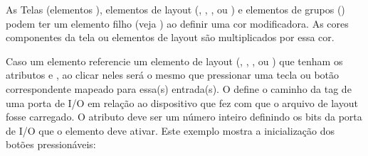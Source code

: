 \documentclass[letterpaper,10pt,brazil]{sphinxmanual}
\begin{document}
As Telas (elementos ), elementos de layout
(, , ,  ou ) e
elementos de grupos () podem ter um elemento filho 
(veja {\hyperref[techspecs/layout_files:layout\string-concepts\string-colours]{}}) ao definir uma cor
modificadora.
As cores componentes da tela ou elementos de layout são multiplicados
por essa cor.

Caso um elemento referencie um elemento de layout
(, , ,  ou ) que
tenham os atributos  e , ao clicar neles será o
mesmo que pressionar uma tecla ou botão correspondente mapeado para
essa(s) entrada(s).
O  define o caminho da tag de uma porta de I/O em relação
ao dispositivo que fez com que o arquivo de layout fosse carregado. O
atributo  deve ser um número inteiro definindo os bits
da porta de I/O que o elemento deve ativar. Este exemplo mostra a
inicialização dos botões pressionáveis:
\end{document}
